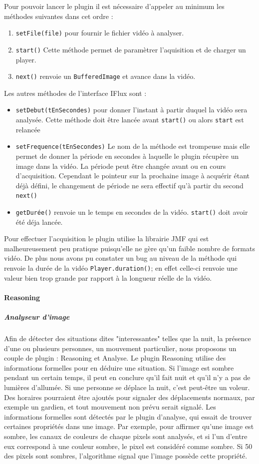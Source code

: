 		Pour pouvoir lancer le plugin il est nécessaire d'appeler au minimum les méthodes suivantes dans cet ordre :
		\begin{enumerate}
			\item{\verb+setFile(file)+} pour fournir le fichier vidéo à analyser.
			\item{\verb+start()+} Cette méthode permet de paramètrer l'aquisition et de charger un player. 
			\item{\verb+next()+} renvoie un \verb+BufferedImage+ et avance dans la vidéo.
		\end{enumerate}

		Les autres méthodes de l'interface IFlux sont :
		\begin{itemize}
			\item{\verb+setDebut(tEnSecondes)+} pour donner l'instant à partir duquel la vidéo sera analysée. Cette méthode doit être lancée avant \verb+start()+ ou alors \verb+start+ est relancée
			\item{\verb+setFrequence(tEnSecondes)+} Le nom de la méthode est trompeuse mais elle permet de donner la période en secondes à laquelle le plugin récupère un image dans la vidéo. La période peut être changée avant ou en cours d'acquisition. Cependant le pointeur sur la prochaine image à acquérir étant déjà défini, le changement de période ne sera effectif qu'à partir du second \verb+next()+
			\item{\verb+getDurée()+} renvoie un le temps en secondes de la vidéo. \verb+start()+ doit avoir été déja lancée.
		\end{itemize}

	Pour effectuer l'acquisition le plugin utilise la librairie JMF qui est malheureusement peu pratique puisqu'elle ne gère qu'un faible nombre de formats vidéo. De plus nous avons pu constater un bug au niveau de la méthode qui renvoie la durée de la vidéo \verb+Player.duration()+; en effet celle-ci renvoie une valeur bien trop grande par rapport à la longueur réelle de la vidéo.

		\paragraph{Reasoning}
			\subparagraph{Analyseur d'image}
				Afin de détecter des situations dites "interessantes" telles que la nuit, la présence d'une ou plusieurs personnes, un mouvement particulier, nous proposons un couple de plugin : Reasoning et Analyse. Le plugin Reasoning utilise des informations formelles pour en déduire une situation. Si l'image est sombre pendant un certain temps, il peut en conclure qu'il fait nuit et qu'il n'y a pas de lumières d'allumée. Si une personne se déplace la nuit, c'est peut-être un voleur. Des horaires pourraient être ajoutés pour signaler des déplacements normaux, par exemple un gardien, et tout mouvement non prévu serait signalé.
	Les informations formelles sont détectés par le plugin d'analyse, qui essait de trouver certaines propriétés dans une image. Par exemple, pour affirmer qu'une image est sombre, les canaux de couleurs de chaque pixels sont analysés, et si l'un d'entre eux correspond à une couleur sombre, le pixel est considéré comme sombre. Si 50 des pixels sont sombres, l'algorithme signal que l'image possède cette propriété.
	
